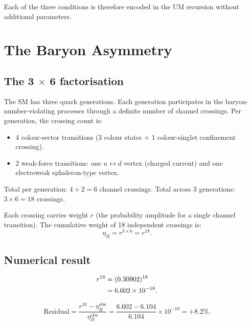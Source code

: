 \documentclass[12pt]{article}
\begin{document}
Each of the three conditions is therefore encoded in the UM recursion
without additional parameters.

\section{The Baryon Asymmetry}

\subsection{The 3 $\times$ 6 factorisation}

The SM has three quark generations. Each generation participates in the
baryon-number-violating processes through a definite number of
channel crossings. Per generation, the crossing count is:

\begin{itemize}
  \item 4 colour-sector transitions (3 colour states + 1 colour-singlet
    confinement crossing).
  \item 2 weak-force transitions: one $u \leftrightarrow d$ vertex
    (charged current) and one electroweak sphaleron-type vertex.
\end{itemize}

Total per generation: $4 + 2 = 6$ channel crossings.
Total across 3 generations: $3 \times 6 = 18$ crossings.

Each crossing carries weight $r$ (the probability amplitude for a
single channel transition). The cumulative weight of 18 independent
crossings is:
\begin{equation}
  \eta_B = r^{3 \times 6} = r^{18}.
  \label{eq:eta_um}
\end{equation}

\subsection{Numerical result}

\begin{align}
  r^{18} &= (0.30902)^{18} \notag\\
         &= 6.602 \times 10^{-10}.
\end{align}

\begin{equation}
  \text{Residual}
  = \frac{r^{18} - \eta_B^{\text{obs}}}{\eta_B^{\text{obs}}}
  = \frac{6.602 - 6.104}{6.104} \times 10^{-10}
  = +8.2\%.
  \label{eq:eta_resid}
\end{equation}
\end{document}
